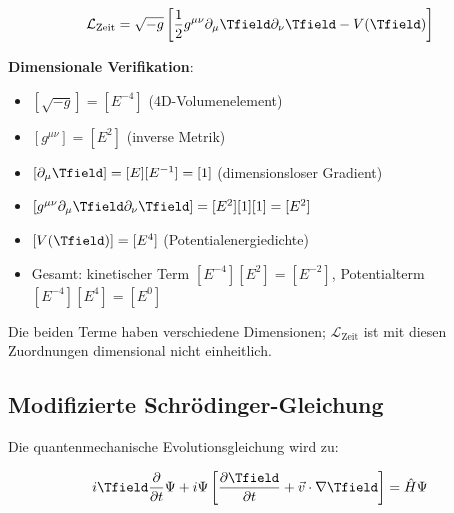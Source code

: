 	\begin{equation}
		\mathcal{L}_{\text{Zeit}} = \sqrt{-g} \left[\frac{1}{2} g^{\mu\nu} \partial_\mu \Tfield \partial_\nu \Tfield - V(\Tfield)\right]
		\label{eq:zeitfeld_lagrange}
	\end{equation}
	
	\textbf{Dimensionale Verifikation}:
	\begin{itemize}
		\item $[\sqrt{-g}] = [E^{-4}]$ (4D-Volumenelement)
		\item $[g^{\mu\nu}] = [E^2]$ (inverse Metrik)
		\item $[\partial_\mu \Tfield] = [E][E^{-1}] = [1]$ (dimensionsloser Gradient)
		\item $[g^{\mu\nu} \partial_\mu \Tfield \partial_\nu \Tfield] = [E^2][1][1] = [E^2]$
		\item $[V(\Tfield)] = [E^4]$ (Potentialenergiedichte)
		\item Gesamt: kinetischer Term $[E^{-4}][E^2] = [E^{-2}]$, Potentialterm $[E^{-4}][E^4] = [E^0]$
	\end{itemize}
	Die beiden Terme haben verschiedene Dimensionen; $\mathcal{L}_{\text{Zeit}}$ ist mit diesen Zuordnungen dimensional nicht einheitlich.
	
	\subsection{Modifizierte Schrödinger-Gleichung}
	\label{subsec:modifizierte_schroedinger}
	
	Die quantenmechanische Evolutionsgleichung wird zu:
	
	\begin{equation}
		i \Tfield \frac{\partial}{\partial t} \Psi + i \Psi \left[\frac{\partial \Tfield}{\partial t} + \vec{v} \cdot \nabla \Tfield\right] = \hat{H} \Psi
		\label{eq:modifizierte_schroedinger}
	\end{equation}
	
